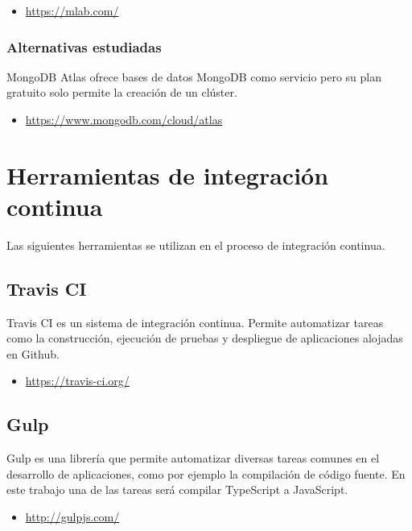 \begin{itemize}
	\item \url{https://mlab.com/}
\end{itemize}

\subsubsection{Alternativas estudiadas}

MongoDB Atlas ofrece bases de datos MongoDB como servicio pero su plan gratuito solo permite la creación de un clúster.

\begin{itemize}
	\item \url{https://www.mongodb.com/cloud/atlas}
\end{itemize}

\section{Herramientas de integración continua}

Las siguientes herramientas se utilizan en el proceso de integración continua.

\subsection{Travis CI}

Travis CI es un sistema de integración continua. Permite automatizar tareas como la construcción, ejecución de pruebas y despliegue de aplicaciones alojadas en Github.

\begin{itemize}
	\item \url{https://travis-ci.org/}
\end{itemize}

\subsection{Gulp}

Gulp es una librería que permite automatizar diversas tareas comunes en el desarrollo de aplicaciones, como por ejemplo la compilación de código fuente. En este trabajo una de las tareas será compilar TypeScript a JavaScript.

\begin{itemize}
	\item \url{http://gulpjs.com/}
\end{itemize}

